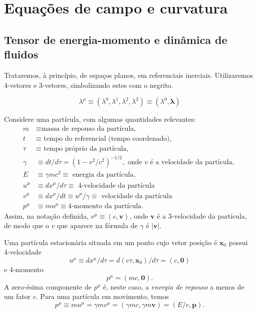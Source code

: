 \chapter{Equações de campo e curvatura}\label{cap:EquacoesDeCampoCurvatura}
\section{Tensor de energia-momento e dinâmica de fluidos}\label{sec:EnergiaMomentoFluidos}
Trataremos, à princípio, de espaços planos, em referenciais inerciais. Utilizaremos 4-vetores e 3-vetores, simbolizando estes com o negrito. 

\[
\lambda^{\mu} \equiv\left(\lambda^{0}, \lambda^{1}, \lambda^{2}, \lambda^{3}\right) \equiv\left(\lambda^{0}, \boldsymbol{\lambda}\right)
\]

Considere uma partícula, com algumas quantidades relevantes:
\begin{align*}
	m 		&\equiv \text{massa de repouso da partícula,} \\
	t 		&\equiv \text { tempo do referencial (tempo coordenado),} \\ 
	\tau 	&\equiv \text { tempo próprio da partícula, } \\ 
	\gamma 	&\equiv d t / d \tau=\left(1-v^{2} / c^{2}\right)^{-1 / 2}, \text { onde } v \text { é a velocidade da partícula, } \\ 
	E 		&\equiv \gamma m c^{2} \equiv \text { energia da partícula, } \\ 
	u^{\mu} &\equiv d x^{\mu} / d \tau \equiv \text { 4-velocidade da partícula } \\ 
	v^{\mu} &\equiv d x^{\mu} / d t \equiv u^{\mu} / \gamma \equiv \text { velocidade da partícula} \\ 
	p^{\mu} &\equiv m u^{\mu} \equiv 4 \text {-momento da partícula.}
\end{align*}
Assim, na notação definida, $ v^\mu \equiv (c, \mathbf{v}) $, onde $\mathbf{v}$ é a 3-velocidade da partícula, de modo que o $v$ que aparece na fórmula de $\gamma$ é $|\mathbf{v}|$. 

Uma partícula estacionária situada em um ponto cujo vetor posição é $\mathbf{x}_0$ possui 4-velocidade
\[
u^\mu \equiv dx^\mu/d\tau = d(c\tau,\mathbf{x}_0)/d\tau = (c,\mathbf{0})
\]
e 4-momento
\[
p^{\mu}=(mc,\mathbf{0}).
\]
A zero-ésima componente de $p^\mu$ é, neste caso, a \textit{energia de repouso} a menos de um fator $c$. Para uma partícula em movimento, temos 
\begin{equation}\label{eq:QuadriMomentoParticula}
	p^\mu \equiv mu^\mu = \gamma m v^\mu = (\gamma mc, \gamma m\mathbf{v})=(E/c,\mathbf{p}).
\end{equation}


